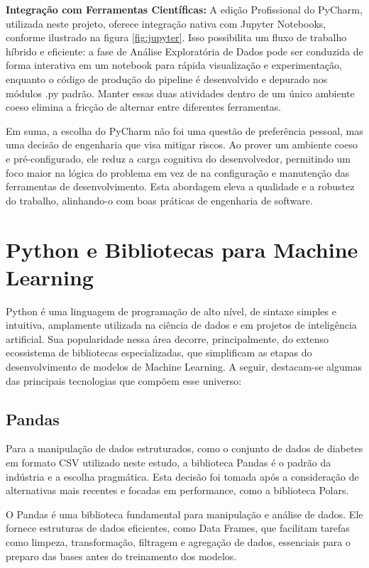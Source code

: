 \textbf{Integração com Ferramentas Científicas:} A edição Profissional do PyCharm, utilizada neste projeto, oferece integração nativa com Jupyter Notebooks, conforme ilustrado na figura \ref{fig:jupyter}. Isso possibilita um fluxo de trabalho híbrido e eficiente: a fase de Análise Exploratória de Dados pode ser conduzida de forma interativa em um notebook para rápida visualização e experimentação, enquanto o código de produção do pipeline é desenvolvido e depurado nos módulos .py padrão. Manter essas duas atividades dentro de um único ambiente coeso elimina a fricção de alternar entre diferentes ferramentas.

Em suma, a escolha do PyCharm não foi uma questão de preferência pessoal, mas uma decisão de engenharia que visa mitigar riscos. Ao prover um ambiente coeso e pré-configurado, ele reduz a carga cognitiva do desenvolvedor, permitindo um foco maior na lógica do problema em vez de na configuração e manutenção das ferramentas de desenvolvimento. Esta abordagem eleva a qualidade e a robustez do trabalho, alinhando-o com boas práticas de engenharia de software.

\section{Python e Bibliotecas para Machine Learning}
Python é uma linguagem de programação de alto nível, de sintaxe simples e intuitiva, amplamente utilizada na ciência de dados e em projetos de inteligência artificial. Sua popularidade nessa área decorre, principalmente, do extenso ecossistema de bibliotecas especializadas, que simplificam as etapas do desenvolvimento de modelos de Machine Learning. A seguir, destacam-se algumas das principais tecnologias que compõem esse universo:

\subsection{Pandas}
Para a manipulação de dados estruturados, como o conjunto de dados de diabetes em formato CSV utilizado neste estudo, a biblioteca Pandas é o padrão da indústria e a escolha pragmática. Esta decisão foi tomada após a consideração de alternativas mais recentes e focadas em performance, como a biblioteca Polars.

O Pandas é uma biblioteca fundamental para manipulação e análise de dados. Ele fornece estruturas de dados eficientes, como Data Frames, que facilitam tarefas como limpeza, transformação, filtragem e agregação de dados, essenciais para o preparo das bases antes do treinamento dos modelos.\cite{McKinney2010} 


